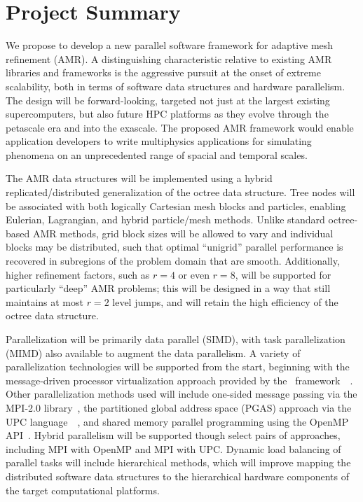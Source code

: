 \documentclass[10pt,twocolumn]{article}
\begin{document}
\section{Project Summary}  \label{s:summary}

We propose to develop a new parallel software framework for adaptive
mesh refinement (AMR).  A distinguishing characteristic relative to
existing AMR libraries and frameworks is the aggressive pursuit at the
onset of extreme scalability, both in terms of software data
structures and hardware parallelism.  The design will be
forward-looking, targeted not just at the largest existing
supercomputers, but also future HPC platforms as they evolve through
the petascale era and into the exascale.  The proposed AMR framework
would enable application developers to write multiphysics applications
for simulating phenomena on an unprecedented range of spacial and
temporal scales.

The AMR data structures will be implemented using a hybrid
replicated/distributed generalization of the octree data structure.
Tree nodes will be associated with both logically Cartesian mesh
blocks and particles, enabling Eulerian, Lagrangian, and hybrid
particle/mesh methods.  Unlike standard octree-based AMR methods, grid
block sizes will be allowed to vary and individual blocks may be
distributed, such that optimal ``unigrid'' parallel performance is
recovered in subregions of the problem domain that are smooth.
Additionally, higher refinement factors, such as $r=4$ or even $r=8$,
will be supported for particularly ``deep'' AMR problems; this will be
designed in a way that still maintains at most $r=2$ level jumps, and
will retain the high efficiency of the octree data structure.

Parallelization will be primarily data parallel (SIMD), with task
parallelization (MIMD) also available to augment the data parallelism.
A variety of parallelization technologies will be supported from the
start, beginning with the message-driven processor virtualization
approach provided by the \charm\
framework~\cite{KaBo07}~\cite{wwwcharm}.  Other parallelization
methods used will include one-sided message passing via the MPI-2.0
library~\cite{wwwmpi}, the partitioned global address space (PGAS)
approach via the UPC language~\cite{wwwupc}~\cite{upc}, and shared
memory parallel programming using the OpenMP API~\cite{wwwopenmp}.
Hybrid parallelism will be supported though select pairs of
approaches, including MPI with OpenMP and MPI with UPC.  Dynamic load
balancing of parallel tasks will include hierarchical methods, which
will improve mapping the distributed software data structures to the
hierarchical hardware components of the target computational
platforms.
\end{document}
